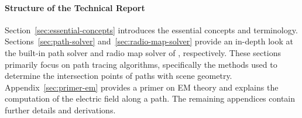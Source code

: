 \paragraph{Structure of the Technical Report}

Section~\ref{sec:essential-concepts} introduces the essential concepts and terminology.
Sections~\ref{sec:path-solver} and~\ref{sec:radio-map-solver} provide an in-depth look at the built-in path solver and radio map solver of \SRT{}, respectively.
These sections primarily focus on path tracing algorithms, specifically the methods used to determine the intersection points of paths with scene geometry.
Appendix~\ref{sec:primer-em} provides a primer on \gls{EM} theory and explains the computation of the electric field along a path. The remaining appendices contain further details and derivations.

